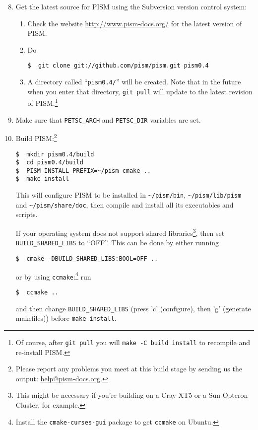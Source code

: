 \documentclass[11pt,final]{amsart}
\renewcommand{\t}[1]{\texttt{#1}}
\begin{document}
\begin{enumerate}\setcounter{enumi}{7}
\item Get the latest source for PISM using the Subversion version control system:
\begin{enumerate}
\item \label{getPISMstep} Check the website \url{http://www.pism-docs.org/} for the latest version of PISM.
\item Do
\begin{verbatim}
$  git clone git://github.com/pism/pism.git pism0.4
\end{verbatim}
\item A directory called ``\texttt{pism0.4/}'' will be created.  Note that in the future when you enter that directory,
  \texttt{git pull} will update to the latest revision of PISM.\footnote{Of course, after \t{git pull} you will \t{make -C
      build install} to recompile and re-install PISM.}
\end{enumerate}

\item Make sure that \texttt{PETSC_ARCH} and \texttt{PETSC_DIR} variables are set.

\item Build PISM:\footnote{Please report any problems you meet at this build stage by sending us the output: \href{mailto:help@pism-docs.org}{help@pism-docs.org}.}
\begin{verbatim}
$  mkdir pism0.4/build
$  cd pism0.4/build
$  PISM_INSTALL_PREFIX=~/pism cmake ..
$  make install
\end{verbatim}%

  This will configure PISM to be installed in \texttt{\textasciitilde/pism/bin}, \texttt{\textasciitilde/pism/lib/pism} and \texttt{\textasciitilde/pism/share/doc}, then
  compile and install all its executables and scripts.

If your operating system does not support shared libraries\footnote{This might be necessary if you're building on a Cray XT5 or a Sun Opteron Cluster, for example.}, then set \texttt{BUILD_SHARED_LIBS} to ``OFF''. This can be done by
either running
\begin{verbatim}
$  cmake -DBUILD_SHARED_LIBS:BOOL=OFF ..
\end{verbatim}%
or by using \texttt{ccmake}:\footnote{Install the \texttt{cmake-curses-gui} package to get \texttt{ccmake} on Ubuntu.} run
\begin{verbatim}
$  ccmake ..
\end{verbatim}%
and then change \texttt{BUILD_SHARED_LIBS} (press 'c' (configure), then 'g' (generate makefiles))
before \texttt{make install}.


\end{enumerate}
\end{document}
